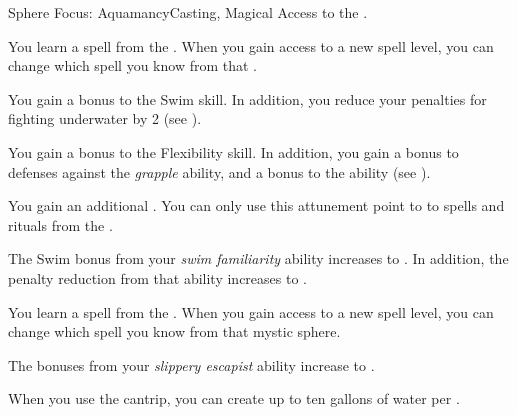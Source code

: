     \begin{feat}{Sphere Focus: Aquamancy}{Casting, Magical}
        \featpre Access to the  .

         You learn a spell from the  .
        When you gain access to a new spell level, you can change which spell you know from that .

         You gain a  bonus to the Swim skill.
        In addition, you reduce your penalties for fighting underwater by 2 (see ).

         You gain a  bonus to the Flexibility skill.
        In addition, you gain a  bonus to defenses against the \textit{grapple} ability, and a  bonus to the  ability (see ).

         You gain an additional .
        You can only use this attunement point to  to spells and rituals from the  .

         The Swim bonus from your \textit{swim familiarity} ability increases to .
        In addition, the penalty reduction from that ability increases to .

         You learn a spell from the  .
        When you gain access to a new spell level, you can change which spell you know from that mystic sphere.

         The bonuses from your \textit{slippery escapist} ability increase to .

         When you use the  cantrip, you can create up to ten gallons of water per .
    \end{feat}

